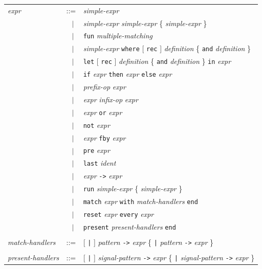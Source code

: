\documentclass[11pt,titlepage,twoside]{report}
\newcommand{\alt}{\;|\;}
\newcommand{\Let}{\mbox{{\tt let}}}
\newcommand{\Rec}{\mbox{{\tt rec}}}
\newcommand{\In}{\mbox{{\tt in}}}
\newcommand{\And}{\mbox{{\tt and}}}
\newcommand{\Fun}{\mbox{{\tt fun}}}
\newcommand{\Function}{\mbox{{\tt function}}}
\newcommand{\If}{\mbox{{\tt if}}}
\newcommand{\Then}{\mbox{{\tt then}}}
\newcommand{\Else}{\mbox{{\tt else}}}
\newcommand{\Not}{\mbox{{\tt not}}}
\newcommand{\Pre}{\mbox{{\tt pre}}}
\newcommand{\Last}{\mbox{{\tt last}}}
\newcommand{\Run}{\mbox{{\tt run}}}
\newcommand{\Fby}{\mbox{{\tt fby}}}
\newcommand{\Minusgreater}{\mbox{{\tt ->}}}
\newcommand{\Reset}{\mbox{{\tt reset}}}
\newcommand{\Every}{\mbox{{\tt every}}}
\newcommand{\Where}{\mbox{{\tt where}}}
\newcommand{\Or}{\mbox{{\tt or}}}
\newcommand{\End}{\mbox{{\tt end}}}
\newcommand{\Match}[2]{\mbox{\tt match}\ #1\ \mbox{\tt with}\ #2 \End}
\newcommand{\term}[1]{{\tt #1}}
\newcommand{\nterm}[1]{{\em #1}}
\begin{document}
\begin{center}
\begin{tabular}{lcl}
\nterm{expr}
   & ::=        & \nterm{simple-expr} \\
   & $\;\;\alt$ & \nterm{simple-expr} \nterm{simple-expr} \{ \nterm{simple-expr} \} \\
   & $\;\;\alt$ & \term{\Fun} \nterm{multiple-matching} \\
   & $\;\;\alt$ & \nterm{simple-expr} \term{\Where} [ \term{\Rec} ]
                  \nterm{definition} \{ \term{\And} \nterm{definition}
                  \} \\
   & $\;\;\alt$ & \term{\Let} [ \term{\Rec} ] \nterm{definition}
                  \{ \term{\And} \nterm{definition} \} \term{\In} 
                  \nterm{expr} \\
   & $\;\;\alt$ & \term{\If} \nterm{expr} \term{\Then} \nterm{expr}
                  \term{\Else} \nterm{expr} \\
   & $\;\;\alt$ & \nterm{prefix-op} \nterm{expr} \\
   & $\;\;\alt$ & \nterm{expr} \nterm{infix-op} \nterm{expr} \\
   & $\;\;\alt$ & \nterm{expr} \term{\Or} \nterm{expr} \\
   & $\;\;\alt$ & \term{\Not} \nterm{expr} \\
      & $\;\;\alt$ & \nterm{expr} \term{\Fby} \nterm{expr} \\
   & $\;\;\alt$ & \term{\Pre} \nterm{expr} \\
   & $\;\;\alt$ & \term{\Last} \nterm{ident} \\
   & $\;\;\alt$ & \nterm{expr} \term{\Minusgreater} \nterm{expr} \\
   & $\;\;\alt$ & \term{\Run} \nterm{simple-expr} \{ \nterm{simple-expr} \} \\
   & $\;\;\alt$ & \term{match} \nterm{expr} \term{with} 
                  \nterm{match-handlers} \term{end} \\
   & $\;\;\alt$ & \term{reset} \nterm{expr} \term{every} \nterm{expr} \\ 
   & $\;\;\alt$ & \term{present} \nterm{present-handlers} \term{end}
\\
\\
\nterm{match-handlers}
   & ::=        & [ \term{|} ] 
                  \nterm{pattern} \term{\Minusgreater} \nterm{expr}
                  \{ \term{|} 
                  \nterm{pattern} \term{\Minusgreater} \nterm{expr} \}
\\
\\
\nterm{present-handlers}
   & ::=        & [ \term{|} ] 
                  \nterm{signal-pattern} \term{->} \nterm{expr}
                  \{ \term{|}
                  \nterm{signal-pattern} \term{->} \nterm{expr} \} 
\end{tabular}
\end{center}
\end{document}
